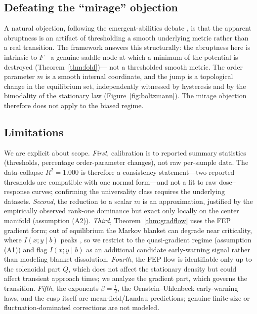 \subsection{Defeating the ``mirage'' objection}

A natural objection, following the emergent-abilities debate \cite{wei2022emergent}, is that the
apparent abruptness is an artifact of thresholding a smooth underlying metric rather than a real
transition. The framework answers this structurally: the abruptness here is intrinsic to $F$---a
genuine saddle-node at which a minimum of the potential is destroyed (Theorem~\ref{thm:fold})---
not a thresholded smooth metric. The order parameter $m$ is a smooth internal coordinate, and the
jump is a topological change in the equilibrium set, independently witnessed by hysteresis and by
the bimodality of the stationary law (Figure~\ref{fig:boltzmann}). The mirage objection therefore
does not apply to the biased regime.

\subsection{Limitations}

We are explicit about scope. \emph{First}, calibration is to reported summary statistics
(thresholds, percentage order-parameter changes), not raw per-sample data. The data-collapse
$R^2=1.000$ is therefore a consistency statement---two reported thresholds are compatible with
one normal form---and not a fit to raw dose--response curves; confirming the universality class
requires the underlying datasets. \emph{Second}, the reduction to a scalar $m$ is an
approximation, justified by the empirically observed rank-one dominance
\cite{nghiem2026trait,minder2026traces} but exact only locally on the center manifold (assumption
(A2)). \emph{Third}, Theorem~\ref{thm:gradflow} uses the FEP gradient form; out of equilibrium
the Markov blanket can degrade near criticality, where $I(x;y\mid b)$ peaks \cite{aguilera2022},
so we restrict to the quasi-gradient regime (assumption (A1)) and flag $I(x;y\mid b)$ as an
additional candidate early-warning signal rather than modeling blanket dissolution.
\emph{Fourth}, the FEP flow is identifiable only up to the solenoidal part $Q$, which does not
affect the stationary density but could affect transient approach times; we analyze the gradient
part, which governs the transition. \emph{Fifth}, the exponents $\beta=\tfrac12$, the
Ornstein--Uhlenbeck early-warning laws, and the cusp itself are mean-field/Landau predictions;
genuine finite-size or fluctuation-dominated corrections are not modeled.

